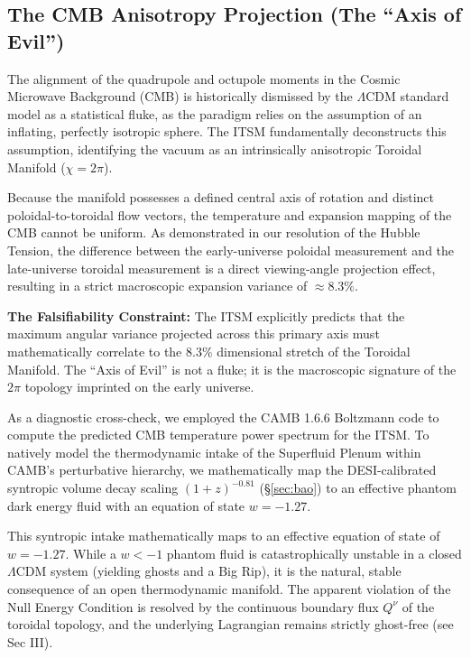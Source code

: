 \documentclass[aps,prd,10pt,onecolumn,superscriptaddress,nofootinbib]{revtex4-2}
\begin{document}
\subsection{The CMB Anisotropy Projection (The ``Axis of Evil'')}
The alignment of the quadrupole and octupole moments in the Cosmic Microwave Background (CMB) \cite{axis_of_evil} is historically dismissed by the $\Lambda$CDM standard model as a statistical fluke, as the paradigm relies on the assumption of an inflating, perfectly isotropic sphere. The ITSM fundamentally deconstructs this assumption, identifying the vacuum as an intrinsically anisotropic Toroidal Manifold ($\chi=2\pi$).

Because the manifold possesses a defined central axis of rotation and distinct poloidal-to-toroidal flow vectors, the temperature and expansion mapping of the CMB cannot be uniform. As demonstrated in our resolution of the Hubble Tension, the difference between the early-universe poloidal measurement and the late-universe toroidal measurement is a direct viewing-angle projection effect, resulting in a strict macroscopic expansion variance of $\approx 8.3\%$.

\textbf{The Falsifiability Constraint:} The ITSM explicitly predicts that the maximum angular variance projected across this primary axis must mathematically correlate to the 8.3\% dimensional stretch of the Toroidal Manifold. The ``Axis of Evil'' is not a fluke; it is the macroscopic signature of the $2\pi$ topology imprinted on the early universe.

As a diagnostic cross-check, we employed the CAMB 1.6.6 Boltzmann code \cite{camb} to compute the predicted CMB temperature power spectrum for the ITSM. To natively model the thermodynamic intake of the Superfluid Plenum within CAMB's perturbative hierarchy, we mathematically map the DESI-calibrated syntropic volume decay scaling $(1+z)^{-0.81}$ (\S\ref{sec:bao}) to an effective phantom dark energy fluid with an equation of state $w = -1.27$.

This syntropic intake mathematically maps to an effective equation of state of $w = -1.27$. While a $w < -1$ phantom fluid is catastrophically unstable in a closed $\Lambda$CDM system (yielding ghosts and a Big Rip), it is the natural, stable consequence of an open thermodynamic manifold. The apparent violation of the Null Energy Condition is resolved by the continuous boundary flux $Q^\nu$ of the toroidal topology, and the underlying Lagrangian remains strictly ghost-free (see Sec III).
\end{document}
